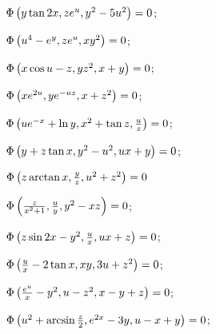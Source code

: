 \begin{enumsols}
		\label{sol:nonlinsys_quazilinear:dim3_part2}
		\item \( \Phi \left( y \tan{2x}, z e^{u}, y^2 - 5u^2 \right) = 0 \); \sfill %
		\item \( \Phi \left( u^4 - e^y, z e^u, x y^2 \right) = 0 \); \sfill %
		\item \( \Phi \left( x \cos{u} - z, y z^2, x + y \right) = 0 \); \sfill %
		\item \( \Phi \left( x e^{2u}, y e^{-uz}, x + z^2 \right) = 0 \); \sfill %
		\item \( \Phi \left( u e^{- x} + \ln{y}, x^2 + \tan{z}, \frac{u}{z} \right) = 0 \); \sfill %
		\item \( \Phi \left( y + z\tan{x}, y^2 - u^2, ux + y \right) = 0 \); \sfill %
		\item \( \Phi \left( z \arctan{x}, \frac{y}{z}, u^2 + z^2 \right) = 0 \) %
		\item \( \Phi \left( \frac{z}{x^2 + 1}, \frac{u}{y}, y^2 - xz \right) = 0 \); \sfill %
		\item \( \Phi \left( z \sin{2x} - y^2, \frac{u}{x}, ux + z \right) = 0 \); \sfill %
		\item \( \Phi \left( \frac{u}{x} - 2 \tan{x}, xy, 3u + z^2 \right) = 0 \); \sfill %
		
		\label{sol:nonlinsys_quazilinear:dim3_hard}
		\item \( \Phi \left( \frac{e^u}{x} - y^2, u - z^2, x - y + z \right) = 0 \); \sfill %
		\item \( \Phi \left( u^2 + \arcsin{\frac{z}{2}}, e^{2 x} - 3y, u - x + y \right) = 0 \); \sfill %

	\end{enumsols}

